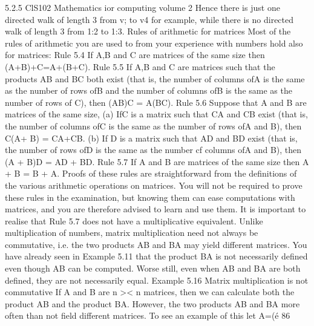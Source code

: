 \documentclass{beamer}
\begin{document}
\begin{frame}
\begin{frame}
\begin{frame}
5.2.5
ClS102 Mathematics ior computing volume 2
Hence there is just one directed walk of length 3 from v; to v4 for
example, while there is no directed walk of length 3 from 1:2 to 1:3.
Rules of arithmetic for matrices
Most of the rules of arithmetic you are used to from your experience
with numbers hold also for matrices:
Rule 5.4 If A,B and C are matrices of the same size then
(A+B)+C=A+(B+C).
Rule 5.5 If A,B and C are matrices such that the products AB and BC
both exist (that is, the number of columns ofA is the same as the
number of rows ofB and the number of columns ofB is the same as
the number of rows of C), then
(AB)C = A(BC).
Rule 5.6 Suppose that A and B are matrices of the same size,
(a) IfC is a matrix such that CA and CB exist (that is, the number of
columns ofC is the same as the number of rows ofA and B), then
C(A+ B) = CA+CB.
(b) If D is a matrix such that AD and BD exist (that is, the number
of rows ofD is the same as the number cf columns ofA and B),
then
(A + B)D = AD + BD.
Rule 5.7 If A and B are matrices of the same size then
A + B = B + A.
Proofs of these rules are straightforward from the deﬁnitions of the
various arithmetic operations on matrices. You will not be required
to prove these rules in the examination, but knowing them can ease
computations with matrices, and you are therefore advised to learn
and use them.
It is important to realise that Rule 5.7 does not have a multiplicative
equivalent. Unlike multiplication of numbers, matrix multiplication
need not always be commutative, i.e. the two products AB and BA
may yield different matrices. You have already seen in Example 5.11
that the product BA is not necessarily deﬁned even though AB can
be computed. Worse still, even when AB and BA are both deﬁned,
they are not necessarily equal.
Example 5.16 Matrix multiplication is not commutative
If A and B are n >< n matrices, then we can calculate both the
product AB and the product BA. However, the two products AB
and BA more often than not ﬁeld different matrices. To see an
example of this let
A=(é %
86




\end{frame}
\end{frame}
\end{frame}
\end{document}
